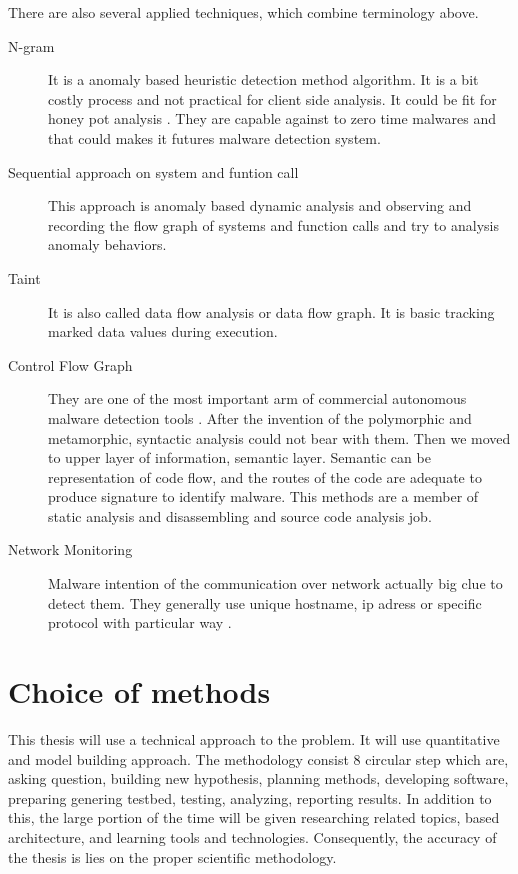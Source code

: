 There are also several applied techniques, which combine terminology above. 
\begin{description}
\item[N-gram] It is a anomaly  based heuristic detection method algorithm. It is a bit costly process and not practical for client side analysis. It could be fit for honey pot analysis \cite{reddy2006n} \cite{abou2004n} \cite{abou2004detection}. They are capable against to zero time malwares and that could makes it futures malware detection system. 
\item[Sequential approach on system and funtion call] This approach is anomaly based dynamic analysis and observing and recording the flow graph of systems and function calls and  try to analysis anomaly behaviors.\cite{kendall2007practical}
\item[Taint] It is also called data flow analysis or data flow graph. It is basic tracking marked data values during execution.\cite{saxena2008efficient}\cite{saxena2008efficient}\cite{smith2007principles}
\item[Control Flow Graph] They are one of the most important arm of commercial autonomous malware detection tools\cite{lee2010detecting} \cite{christodorescu2006static} \cite{christodorescu2005semantics}. After the invention of the polymorphic and metamorphic, syntactic analysis could not bear with them. Then we moved to upper layer of information, semantic layer. Semantic can be representation of code flow, and the routes of the code are adequate to produce signature to identify malware. This methods are a member of static analysis and disassembling and source code analysis job.
\item[Network Monitoring] Malware intention of the communication over network actually big clue to detect them. They generally use unique hostname, ip adress or specific protocol with particular way \cite{marpaung2012survey}.
\end{description}

\section{Choice of methods}
This thesis will use a technical approach to the problem. It will use quantitative and model building approach. The methodology consist 8 circular step which are, asking question, building new hypothesis, planning methods, developing software, preparing genering testbed, testing, analyzing, reporting results. In addition to this, the large portion of the time will be given researching related topics, based architecture, and learning tools and technologies. Consequently, the accuracy of the thesis is lies on the proper scientific methodology.

